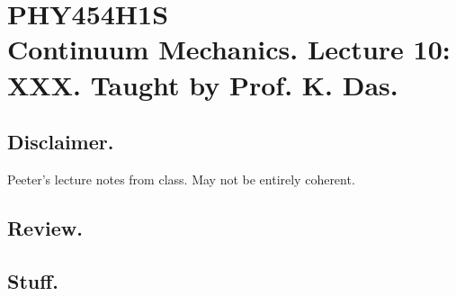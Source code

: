 
%

\chapter{PHY454H1S\\Continuum Mechanics.  Lecture 10: XXX.  Taught by Prof. K. Das.}
\label{chap:continuumL10}
{}
\date{Feb 10, 2012}

\beginArtWithToc

\section{Disclaimer.}

Peeter's lecture notes from class.  May not be entirely coherent.

\section{Review.}

\section{Stuff.}


\EndArticle
